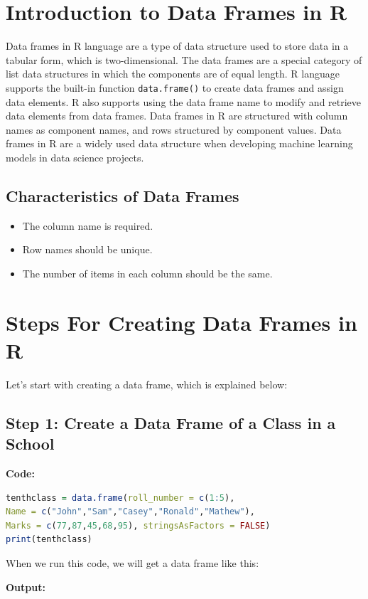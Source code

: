 \documentclass[10pt]{book}
\begin{document}
\section{Introduction to Data Frames in R}

Data frames in R language are a type of data structure used to store data in a tabular form, which is two-dimensional. The data frames are a special category of list data structures in which the components are of equal length. R language supports the built-in function \texttt{data.frame()} to create data frames and assign data elements. R also supports using the data frame name to modify and retrieve data elements from data frames. Data frames in R are structured with column names as component names, and rows structured by component values. Data frames in R are a widely used data structure when developing machine learning models in data science projects.

\subsection{Characteristics of Data Frames}
\begin{itemize}
    \item The column name is required.
    \item Row names should be unique.
    \item The number of items in each column should be the same.
\end{itemize}

\section{Steps For Creating Data Frames in R}

Let’s start with creating a data frame, which is explained below:

\subsection{Step 1: Create a Data Frame of a Class in a School}
\textbf{Code:}
\begin{lstlisting}[language=R]
tenthclass = data.frame(roll_number = c(1:5),
Name = c("John","Sam","Casey","Ronald","Mathew"),
Marks = c(77,87,45,68,95), stringsAsFactors = FALSE)
print(tenthclass)
\end{lstlisting}

When we run this code, we will get a data frame like this:

\textbf{Output:}
\end{document}

